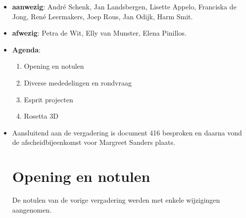 
   \RosDate{\today}
   \RosSupersedes{-}
   \MakeRosTitle
\begin{itemize}
  \item {\bf aanwezig}: Andr\'{e} Schenk, Jan Landsbergen, Lisette Appelo,
                     Franciska de Jong, Ren\'{e} Leermakers, Joep Rous,
                     Jan Odijk, Harm Smit.
  \item {\bf afwezig}: Petra de Wit, Elly van Munster, Elena Pinillos.
  \item {\bf Agenda}:
    \begin{enumerate}
       \item Opening en notulen
       \item Diverse mededelingen en rondvraag
       \item Esprit projecten
       \item Rosetta 3D
    \end{enumerate}
  \item Aansluitend aan de vergadering is document 416 besproken en daarna
        vond de afscheidbijeenkomst voor Margreet Sanders plaats.

\section {Opening en notulen}
De notulen van de vorige vergadering werden met enkele wijzigingen aangenomen.

\end{itemize}
